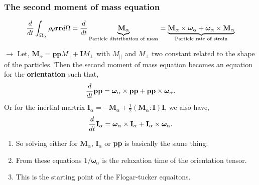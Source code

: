 \documentclass{sintefbeamer}
\begin{document}
\begin{frame}
  \frametitle{The second moment of mass equation }
  \begin{equation*}
    \frac{d}{d t} \int_{\Omega_\alpha} \rho_d\textbf{rr} d\Omega =
    \frac{d}{d t} 
    \underbrace{\textbf{M}_\alpha}_\text{Particle distribution of mass}
    =
    \underbrace{\textbf{M}_\alpha \times \bm\omega_\alpha+ \bm\omega_\alpha \times \textbf{M}_\alpha }_\text{Particle rate of strain}
  \end{equation*}
  
  $\to$ Let, $\textbf{M}_\alpha = \textbf{pp} M_{||} + \textbf{I} M_\bot $ with $M_{||}$ and $M_\bot$ two constant related to the shape of the particles.
  Then the second moment of mass equation becomes an equation for the \textbf{orientation} such that, 
  \begin{equation}
    \frac{d}{d t} \textbf{pp} = 
    \bm\omega_\alpha \times \textbf{pp}
    + \textbf{pp} \times \bm\omega_\alpha.
  \end{equation}
  Or for the inertial martrix $\textbf{I}_\alpha = - \textbf{M}_\alpha + \frac{1}{2}(\textbf{M}_\alpha : \textbf{I})\textbf{I}$, we also have,
  \begin{equation}
    \frac{d}{d t} \textbf{I}_\alpha = 
    \bm\omega_\alpha \times \textbf{I}_\alpha
    + \textbf{I}_\alpha \times \bm\omega_\alpha.
  \end{equation}
  \begin{enumerate}
    \item So solving either for $\textbf{M}_\alpha$, $\textbf{I}_\alpha$ or \textbf{pp} is basically the same thing.
    \item From these equations $1/\bm\omega_\alpha$ is the relaxation time of the orientation tensor. 
    \item This is the starting point of the Flogar-tucker equaitons. 
  \end{enumerate}
\end{frame}
\end{document}
